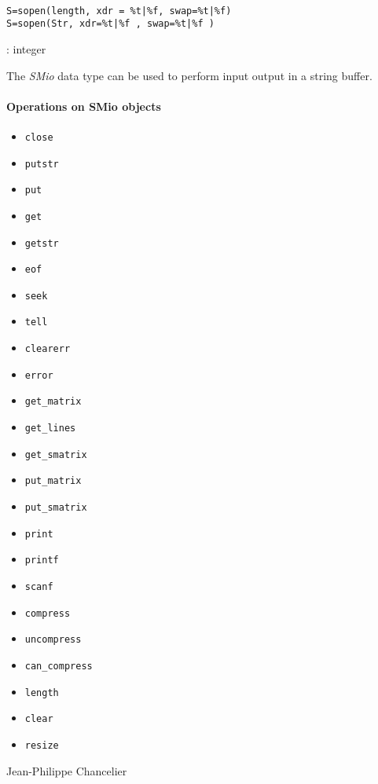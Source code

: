 
\begin{mandesc}
   \\
\end{mandesc}
\begin{calling_sequence}
\begin{verbatim}
S=sopen(length, xdr = %t|%f, swap=%t|%f)
S=sopen(Str, xdr=%t|%f , swap=%t|%f )
\end{verbatim}
\end{calling_sequence}
\begin{parameters}
  \begin{varlist}
    : integer
  \end{varlist}
\end{parameters}

\begin{mandescription}
The \emph{SMio} data type can be used to perform input 
output in a string buffer. 
\end{mandescription}

\paragraph{Operations on SMio objects}
\begin{itemize}
  \item \verb+close+ 
  \item \verb+putstr+ 
  \item \verb+put+ 
  \item \verb+get+ 
  \item \verb+getstr+ 
  \item \verb+eof+ 
  \item \verb+seek+ 
  \item \verb+tell+ 
  \item \verb+clearerr+ 
  \item \verb+error+ 
  \item \verb+get_matrix+ 
  \item \verb+get_lines+ 
  \item \verb+get_smatrix+ 
  \item \verb+put_matrix+ 
  \item \verb+put_smatrix+ 
  \item \verb+print+ 
  \item \verb+printf+ 
  \item \verb+scanf+ 
  \item \verb+compress+ 
  \item \verb+uncompress+ 
  \item \verb+can_compress+ 
  \item \verb+length+ 
  \item \verb+clear+ 
  \item \verb+resize+ 
\end{itemize}
\begin{authors}
   Jean-Philippe Chancelier
\end{authors}
